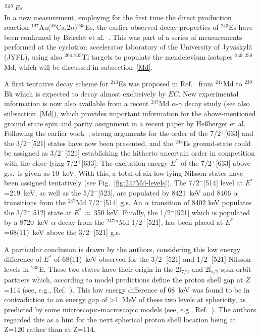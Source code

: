 {\it $^{\it243}$Es}\\ 
In a new measurement, employing for the first time the direct production reaction $^{197}$Au($^{48}$Ca,$2n$)$^{243}$Es, the earlier observed decay properties of $^{243}$Es have been confirmed by Briselet et al.~\cite{Briselet2019}. 
This was part of a series of measurements performed at the cyclotron accelerator laboratory of the University of Jyv\"{a}skyl\"{a} (JYFL), using also $^{203,205}$Tl targets to populate the mendelevium isotopes $^{249,250}$Md, which will be discussed in subsection~\ref{Md}. 

A first tentative decay scheme for $^{243}$Es was proposed in Ref.~\cite{Antalic2010} from $^{247}$Md to $^{239}$Bk which is expected to decay almost exclusively by $EC$.  
New experimental information is now also available from a recent $^{247}$Md $\alpha$-$\gamma$ decay study (see also subsection~\ref {Md}), which provides important information for the above-mentioned ground state spin and parity assignment in a recent paper by He{\ss}berger et al.~\cite{Hessberger2022}.
Following the earlier work~\cite{Antalic2010}, strong arguments for the order of the 7/2$^+$[633] and the 3/2$^-$[521] states have now been presented, and the $^{243}$Es ground-state could be assigned as 3/2$^-[$521$]$ establishing the hitherto uncertain order in competition with the close-lying 7/2$^+[$633$]$. 
The excitation energy $E^*$ of the 7/2$^+[$633$]$ above g.s.~is given as 10~keV. 
With this, a total of six low-lying Nilsson states have been assigned tentatively (see Fig.~\ref{fig:247Md-levels}). 
The 7/2$^-[$514$]$ level at $E^*$=219~keV, as well as the 5/2$^-$[523], are populated by 8421~keV and 8406 $\alpha$ transitions from the $^{247}$Md 7/2$^-[$514$]$ g.s.
An $\alpha$ transition of 8402 keV populates the 3/2$^-$[512] state at $E^*$\,$\approx$\,350 keV.
Finally, the 1/2$^-[$521$]$ which is populated by a 8720~keV $\alpha$ decay from the $^{247m}$Md 1/2$^-[$521$]$, has been placed at $E^*$=68(11)~keV above the 3/2$^-$[521] g.s. 

A particular conclusion is drawn by the authors, considering this low energy difference of $E^*$ of 68(11)~keV observed for the  3/2$^-[$521$]$ and 1/2$^-[$521$]$ Nilsson levels in  $^{243}$E.
These two states have their origin in the 2f$_{7/2}$ and 2f$_{5/2}$ spin-orbit partners which, according to model predictions define the proton shell gap at $Z$=114 (see, e.g., Ref.~\cite{Chasman1977}).
This low energy difference of 68~keV was found to be in contradiction to an energy gap of >1~MeV of these two levels at sphericity, as predicted by some microscopic-macroscopic models (see, e.g., Ref.~\cite{Chasman1977}). 
The authors regarded this as a hint for the next spherical proton shell location being at Z=120 rather than at Z=114.\\

